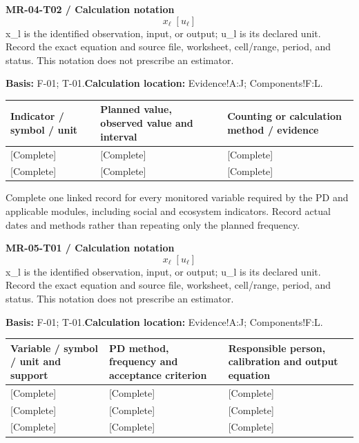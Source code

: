 \par\begingroup\sffamily\fontsize{8.4}{10.5}\selectfont\color{NEBGreen}
\textbf{MR-04-T02 / Calculation notation}\
{\fontsize{10}{12}\selectfont\[x_{\ell}\;[u_{\ell}]\]}
x\_l is the identified observation, input, or output; u\_l is its declared unit. Record the exact equation and source file, worksheet, cell/range, period, and status. This notation does not prescribe an estimator.\par
\textbf{Basis:} F-01; T-01.\quad\textbf{Calculation location:} Evidence!A:J; Components!F:L.\par\endgroup
{\sffamily\fontsize{8.6}{10.7}\selectfont\begin{longtable}{@{}P{48mm}P{61mm}P{53mm}@{}}
\toprule
\textbf{Indicator / symbol / unit} & \textbf{Planned value, observed value and interval} & \textbf{Counting or calculation method / evidence}\\\midrule\endhead
\rule{0pt}{8mm}[Complete] & [Complete] & [Complete]\\\hline
\rule{0pt}{8mm}[Complete] & [Complete] & [Complete]\\\hline
\end{longtable}}
Complete one linked record for every monitored variable required by the PD and applicable modules, including social and ecosystem indicators. Record actual dates and methods rather than repeating only the planned frequency.\par
\BlockTitle{MR-05-T01 / Variable and planned protocol}
\par\begingroup\sffamily\fontsize{8.4}{10.5}\selectfont\color{NEBGreen}
\textbf{MR-05-T01 / Calculation notation}\
{\fontsize{10}{12}\selectfont\[x_{\ell}\;[u_{\ell}]\]}
x\_l is the identified observation, input, or output; u\_l is its declared unit. Record the exact equation and source file, worksheet, cell/range, period, and status. This notation does not prescribe an estimator.\par
\textbf{Basis:} F-01; T-01.\quad\textbf{Calculation location:} Evidence!A:J; Components!F:L.\par\endgroup
{\sffamily\fontsize{8.6}{10.7}\selectfont\begin{longtable}{@{}P{48mm}P{61mm}P{53mm}@{}}
\toprule
\textbf{Variable / symbol / unit and support} & \textbf{PD method, frequency and acceptance criterion} & \textbf{Responsible person, calibration and output equation}\\\midrule\endhead
\rule{0pt}{8mm}[Complete] & [Complete] & [Complete]\\\hline
\rule{0pt}{8mm}[Complete] & [Complete] & [Complete]\\\hline
\rule{0pt}{8mm}[Complete] & [Complete] & [Complete]\\\hline
\end{longtable}}
